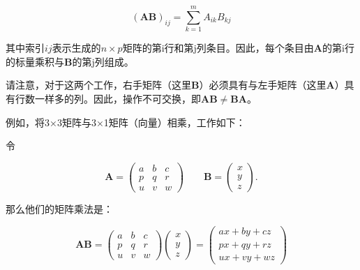\begin{equation}
(\mathbf{AB})_{ij}=\sum_{k=1}^mA_{ik}B_{kj}
\end{equation}




其中索引$ij$表示生成的$n\times p$矩阵的第i行和第j列条目。因此，每个条目由$\mathbf{A}$的第i行的标量乘积与$\mathbf{B}$的第j列组成。

请注意，对于这两个工作，右手矩阵（这里$\mathbf{B}$）必须具有与左手矩阵（这里$\mathbf{A}$）具有行数一样多的列。因此，操作不可交换，即$\mathbf{AB}\neq\mathbf{BA}$。

例如，将3×3矩阵与3×1矩阵（向量）相乘，工作如下：

令

\begin{equation}\nonumber
\mathbf{A} = \begin{pmatrix}
a & b & c \\
p & q & r \\
u & v & w
\end{pmatrix} \qquad \mathbf{B} = \begin{pmatrix}
x \\
y \\
z
\end{pmatrix}.
\end{equation}

那么他们的矩阵乘法是：

\begin{equation}\nonumber
\mathbf{AB} = \begin{pmatrix}
a & b & c \\
p & q & r \\
u & v & w
\end{pmatrix} \begin{pmatrix}
x \\
y \\
z
\end{pmatrix} =\begin{pmatrix}
ax + by + cz \\
px + qy + rz \\
ux + vy + wz
\end{pmatrix}
\end{equation}

